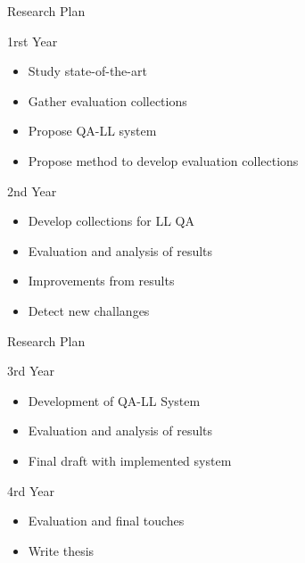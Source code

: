 \documentclass{beamer}
\begin{document}
\begin{frame}{Research Plan}
  \begin{alertblock}{1rst Year}
    \begin{itemize}
      \item Study state-of-the-art
      \item Gather evaluation collections
      \item Propose QA-LL system
      \item Propose method to develop evaluation collections
    \end{itemize}
  \end{alertblock}

  \begin{alertblock}{2nd Year}
    \begin{itemize}
      \item Develop collections for LL QA
      \item Evaluation and analysis of results
      \item Improvements from results
      \item Detect new challanges
    \end{itemize}
  \end{alertblock}
\end{frame}

\begin{frame}{Research Plan}
  \begin{alertblock}{3rd Year}
    \begin{itemize}
      \item Development of QA-LL System
      \item Evaluation and analysis of results
      \item Final draft with implemented system
    \end{itemize}
  \end{alertblock}

  \begin{alertblock}{4rd Year}
    \begin{itemize}
      \item Evaluation and final touches
      \item Write thesis
    \end{itemize}
  \end{alertblock}
\end{frame}
\end{document}
